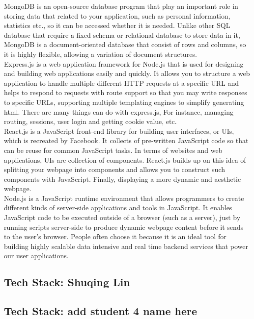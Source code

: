 \documentclass[a4paper, 11pt]{report}
\begin{document}
\noindent MongoDB is an open-source database program that play an important role in storing data that related to your application, such as personal information, statistics etc., so it can be accessed whether it is needed. Unlike other SQL database that require a fixed schema or relational database to store data in it, MongoDB is a document-oriented database that consist of rows and columns, so it is highly flexible, allowing a variation of document structures.\\

\noindent Express.js is a web application framework for Node.js that is used for designing and building web applications easily and quickly. It allows you to structure a web application to handle multiple different HTTP requests at a specific URL and helps to respond to requests with route support so that you may write responses to specific URLs, supporting multiple templating engines to simplify generating html. There are many things can do with express.js, For instance, managing routing, sessions, user login and getting cookie value, etc.\\

\noindent React.js is a JavaScript front-end library for building user interfaces, or UIs, which is recreated by Facebook. It collects of pre-written JavaScript code so that can be reuse for common JavaScript tasks. In terms of websites and web applications, UIs are collection of components. React.js builds up on this idea of splitting your webpage into components and allows you to construct such components with JavaScript. Finally, displaying a more dynamic and aesthetic webpage.\\

\noindent Node.js is a JavaScript runtime environment that allows programmers to create different kinds of server-side applications and tools in JavaScript. It enables JavaScript code to be executed outside of a browser (such as a server), just by running scripts server-side to produce dynamic webpage content before it sends to the user’s browser. People often choose it because it is an ideal tool for building highly scalable data intensive and real time backend services that power our user applications.\\

\subsection{Tech Stack: Shuqing Lin}


\subsection{Tech Stack: add student 4 name here}
\end{document}
